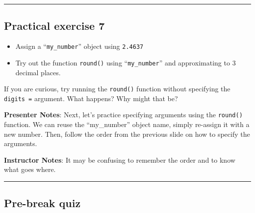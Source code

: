 \documentclass[
  letterpaper,
  DIV=11,
  numbers=noendperiod]{scrartcl}
\providecommand{\tightlist}{%
  \setlength{\itemsep}{0pt}\setlength{\parskip}{0pt}}
\begin{document}
\begin{center}\rule{0.5\linewidth}{0.5pt}\end{center}

\subsection{Practical exercise 7}\label{practical-exercise-7}

\begin{itemize}
\tightlist
\item[$\square$]
  Assign a ``\texttt{my\_number}'' object using \texttt{2.4637}
\item[$\square$]
  Try out the function \texttt{round()} using ``\texttt{my\_number}''
  and approximating to 3 decimal places.
\end{itemize}

\begin{tcolorbox}[enhanced jigsaw, arc=.35mm, bottomrule=.15mm, bottomtitle=1mm, breakable, colback=white, colbacktitle=quarto-callout-tip-color!10!white, colframe=quarto-callout-tip-color-frame, coltitle=black, left=2mm, leftrule=.75mm, opacityback=0, opacitybacktitle=0.6, rightrule=.15mm, title=\textcolor{quarto-callout-tip-color}{\faLightbulb}\hspace{0.5em}{Ignoring the \textbf{digits} argument}, titlerule=0mm, toprule=.15mm, toptitle=1mm]

If you are curious, try running the \texttt{round()} function without
specifying the \texttt{digits\ =} argument. What happens? Why might that
be?

\end{tcolorbox}

\textbf{Presenter Notes}: Next, let's practice specifying arguments
using the \texttt{round()} function. We can reuse the ``my\_number''
object name, simply re-assign it with a new number. Then, follow the
order from the previous slide on how to specify the arguments.

\textbf{Instructor Notes}: It may be confusing to remember the order and
to know what goes where.

\begin{center}\rule{0.5\linewidth}{0.5pt}\end{center}

\subsection{Pre-break quiz}\label{pre-break-quiz}
\end{document}
